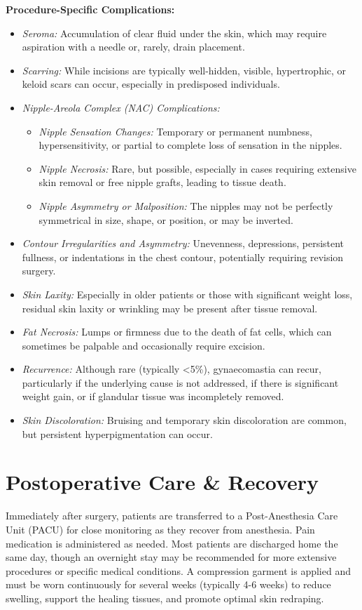 \textbf{Procedure-Specific Complications:}
\begin{itemize}
  \item \textit{Seroma:} Accumulation of clear fluid under the skin, which may require aspiration with a needle or, rarely, drain placement.
  \item \textit{Scarring:} While incisions are typically well-hidden, visible, hypertrophic, or keloid scars can occur, especially in predisposed individuals.
  \item \textit{Nipple-Areola Complex (NAC) Complications:}
    \begin{itemize}
      \item \textit{Nipple Sensation Changes:} Temporary or permanent numbness, hypersensitivity, or partial to complete loss of sensation in the nipples.
      \item \textit{Nipple Necrosis:} Rare, but possible, especially in cases requiring extensive skin removal or free nipple grafts, leading to tissue death.
      \item \textit{Nipple Asymmetry or Malposition:} The nipples may not be perfectly symmetrical in size, shape, or position, or may be inverted.
    \end{itemize}
  \item \textit{Contour Irregularities and Asymmetry:} Unevenness, depressions, persistent fullness, or indentations in the chest contour, potentially requiring revision surgery.
  \item \textit{Skin Laxity:} Especially in older patients or those with significant weight loss, residual skin laxity or wrinkling may be present after tissue removal.
  \item \textit{Fat Necrosis:} Lumps or firmness due to the death of fat cells, which can sometimes be palpable and occasionally require excision.
  \item \textit{Recurrence:} Although rare (typically <5\%), gynaecomastia can recur, particularly if the underlying cause is not addressed, if there is significant weight gain, or if glandular tissue was incompletely removed.
\item \textit{Skin Discoloration:} Bruising and temporary skin discoloration are common, but persistent hyperpigmentation can occur.
\end{itemize}

\section*{Postoperative Care \& Recovery}
Immediately after surgery, patients are transferred to a Post-Anesthesia Care Unit (PACU) for close monitoring as they recover from anesthesia. Pain medication is administered as needed. Most patients are discharged home the same day, though an overnight stay may be recommended for more extensive procedures or specific medical conditions. A compression garment is applied and must be worn continuously for several weeks (typically 4-6 weeks) to reduce swelling, support the healing tissues, and promote optimal skin redraping.

